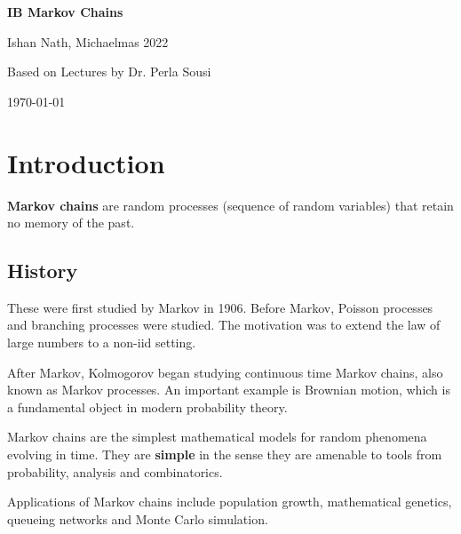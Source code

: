 \documentclass[12pt]{article}
\theoremstyle{definition}
\theoremstyle{remark}
\begin{document}
\hypersetup{pageanchor=false}
\begin{titlepage}
	\begin{center}
		\vspace*{1em}
		\Huge
		\textbf{IB Markov Chains}

		\vspace{1em}
		\large
		Ishan Nath, Michaelmas 2022

		\vspace{1.5em}

		\Large

		Based on Lectures by Dr. Perla Sousi

		\vspace{1em}

		\large
		\today
	\end{center}
	
\end{titlepage}
\hypersetup{pageanchor=true}

\tableofcontents

\newpage

\setcounter{section}{-1}

\section{Introduction}%
\label{sec:introduction}

\textbf{Markov chains} are random processes (sequence of random variables) that retain no memory of the past.

\subsection{History}%
\label{sub:history}

These were first studied by Markov in 1906. Before Markov, Poisson processes and branching processes were studied. The motivation was to extend the law of large numbers to a non-iid setting.

After Markov, Kolmogorov began studying continuous time Markov chains, also known as Markov processes. An important example is Brownian motion, which is a fundamental object in modern probability theory.

Markov chains are the simplest mathematical models for random phenomena evolving in time. They are \textbf{simple} in the sense they are amenable to tools from probability, analysis and combinatorics.

Applications of Markov chains include population growth, mathematical genetics, queueing networks and Monte Carlo simulation.
\end{document}
